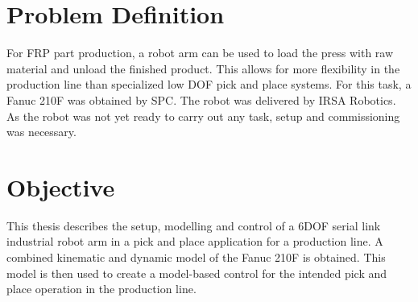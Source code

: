 \section{Problem Definition}

For \ac{FRP} part production, a robot arm can be used to load the press with raw material and unload the finished product. This allows for more flexibility in the production line than specialized low \ac{DOF} pick and place systems.
For this task, a Fanuc 210F was obtained by \ac{SPC}. The robot was delivered by IRSA Robotics. As the robot was not yet ready to carry out any task, setup and commissioning was necessary. 

\medskip

\section{Objective}

This thesis describes the setup, modelling and control of a 6\ac{DOF} serial link industrial robot arm in a pick and place application for a production line. A combined kinematic and dynamic model of the Fanuc 210F is obtained. This model is then used to create a model-based control for the intended pick and place operation in the production line.

